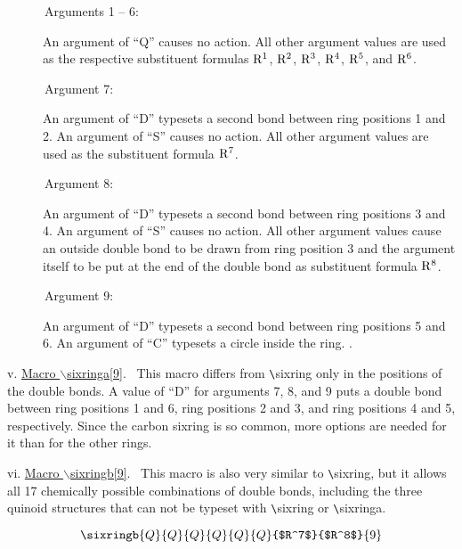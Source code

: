  \begin{description}
 \item[{\rm \ \ \ \ \ \ Arguments 1 -- 6:}] An argument of ``Q'' causes
      no action. All other argument values are used as the respective
      substituent formulas ${\rm R^1}$, ${\rm R^2}$, ${\rm R^3}$,
      ${\rm R^4}$, ${\rm R^5}$, and ${\rm R^6}$.
 \item[{\rm \ \ \ \ \ \ Argument 7:}] An argument of ``D'' typesets
      a second bond between ring positions 1 and 2. An argument
      of ``S'' causes no action. All other argument values are
      used as the substituent formula ${\rm R^7}$.
 \item[{\rm \ \ \ \ \ \ Argument 8:}] An argument of ``D'' typesets
      a second bond between ring positions 3 and 4. An argument
      of ``S'' causes no action. All other argument values cause
      an outside double bond to be drawn from ring position 3
      and the argument itself to be put at the end of the double
      bond as substituent formula ${\rm R^8}$.
 \item[{\rm \ \ \ \ \ \ Argument 9:}] An argument of ``D'' typesets
      a second bond between ring positions 5 and 6. An argument
      of ``C'' typesets a circle inside the ring. \ri .
 \end{description}
 
 \vspace{\len mm}
 \indent v. \underline{Macro $\backslash $sixringa[9]}.
 \ This macro differs from \verb+\+sixring only in the positions
 of the double bonds. A value of ``D'' for arguments 7, 8, and 9
 puts a double bond between ring positions 1 and 6, ring positions
 2 and 3, and ring positions 4 and 5, respectively.
 Since the carbon sixring is so common, more options are needed
 for it than for the other rings.

 \vspace{\len mm}
 \indent vi. \underline{Macro $\backslash $sixringb[9]}.
 \ This macro is also very similar to \verb+\+sixring, but it
 allows all 17 chemically possible combinations of double bonds,
 including the three quinoid structures that can not be typeset
 with \verb+\+sixring or \verb+\+sixringa.

 \[ \sixringb{Q}{Q}{Q}{Q}{Q}{Q}{$R^7$}{$R^8$}{9}  \]

